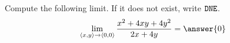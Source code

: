 \documentclass{ximera}
\author{Jim Talamo \and Bart Snapp}
\begin{document}
\begin{exercise}
  Compute the following limit. If it does not exist, write $\verb|DNE|$.
  \[
  \lim_{\vector{x,y}\to \vector{0,0}}\frac{x^2+4xy+4y^2}{2x+4y} = \answer{0}
  \]
  
  \begin{hint}
  
  \end{hint}
\end{exercise}
\end{document}

